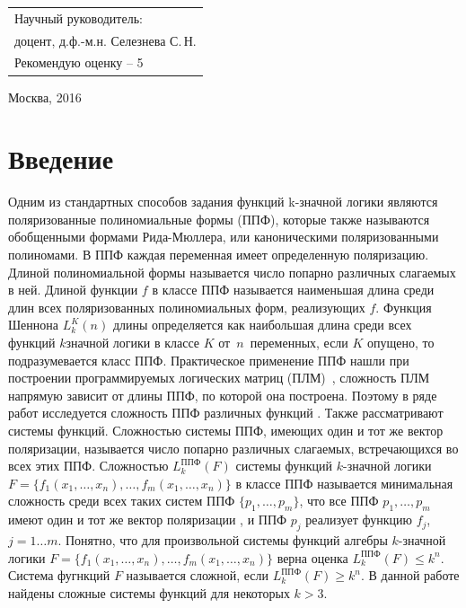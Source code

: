 \documentclass [12pt, a4paper] {extarticle}
\begin{document}

\hfill
\begin{tabular}{l}%
    Научный руководитель: \\
    доцент, д.ф.-м.н. Селезнева С.\,Н. \\
    Рекомендую  оценку -- 5 \underline{\hspace{48pt}} \\
\end{tabular}

\vspace{1.5cm}

\begin {center}
Москва, 2016
\end {center}


\enlargethispage {4 \baselineskip}

{}
\section{Введение}

Одним из стандартных способов задания функций k\nobreakdash-значной логики
являются поляризованные полиномиальные формы (ППФ), которые также называются
обобщенными формами Рида-Мюллера, или каноническими поляризованными полиномами.
В ППФ каждая переменная имеет определенную поляризацию.  Длиной полиномиальной
формы называется число попарно различных слагаемых в ней.  Длиной функции $f$ в
классе ППФ называется наименьшая длина среди длин всех поляризованных
полиномиальных форм, реализующих $f$. Функция Шеннона $L^K_k(n)$ длины
определяется как наибольшая длина среди всех функций $k$\nobreakdash значной
логики в классе $K$ от~$n$~переменных, если $K$ опущено, то подразумевается
класс ППФ. Практическое применение ППФ нашли при построении программируемых
логических матриц (ПЛМ)~\cite{ue04, sb90}, сложность ПЛМ напрямую зависит от
длины ППФ, по которой она построена. Поэтому в ряде работ исследуется сложность
ППФ различных функций \cite{sv93,pn95,ss02,kk05,sd08,mn12,sm09}. Также
рассматривают системы функций. Сложностью системы ППФ, имеющих один и тот же
вектор поляризации, называется число попарно различных слагаемых, встречающихся
во всех этих ППФ. Сложностью $L_k^\text{ППФ}(F)$ системы функций $k$-значной
логики $F = \{f_1(x_1, \ldots, x_n), \ldots, f_m(x_1, \ldots, x_n)\}$ в классе
ППФ называется минимальная сложность среди всех таких систем ППФ $\{p_1, \dots,
p_m\}$, что все ППФ $p_1, \dots, p_m$ имеют один и тот же вектор поляризации ,
и ППФ $p_j$ реализует функцию $f_j$, $j=1 \dots m$.  Понятно, что для
произвольной системы функций алгебры $k$-значной логики $F = \{f_1(x_1, \ldots,
x_n), \ldots, f_m(x_1, \ldots, x_n)\}$ верна оценка $L_k^\text{ППФ}(F)
\leqslant k^n$. Система фугнкций $F$ называется сложной, если
$L_k^\text{ППФ}(F) \geqslant k^n$. В данной работе найдены сложные системы
функций для некоторых $k > 3$.
\end{document}
